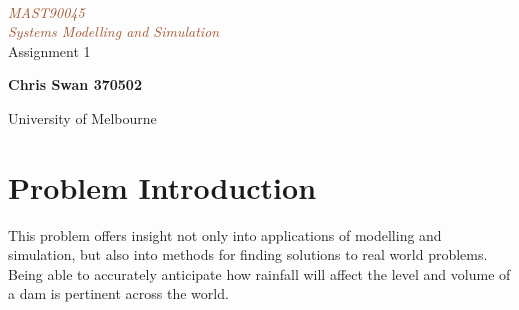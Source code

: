 \documentclass[a4paper, 11pt, oneside]{article}
\newcommand*{\plogo}{\fbox{$\mathcal{PL}$}} %
\begin{document}
\begin{titlepage} %

	\centering %
	
	
	\setlength{\unitlength}{0.6\textwidth} %
	
	{\color{LightGoldenrod}}\\[\baselineskip] %
	
	\textcolor{Sienna}{\textit{\Huge MAST90045\\ $\;$ \\Systems Modelling and Simulation}}\\[\baselineskip] %
	
	{\color{RosyBrown}\Large Assignment 1}\\ %
	
	{\color{LightGoldenrod}} %
	
	\vfill %
	
	
	{\Large\textbf{Chris Swan 370502}}\\ %
	
	\vfill %
	
	
	
	University of Melbourne %

\end{titlepage}

\tableofcontents

\newpage
\section{Problem Introduction}

This problem offers insight not only into applications of modelling and simulation, but also into methods for finding solutions to real world problems. Being able to accurately anticipate 
how rainfall will affect the level and volume of a dam is pertinent across the world. \\
\end{document}
